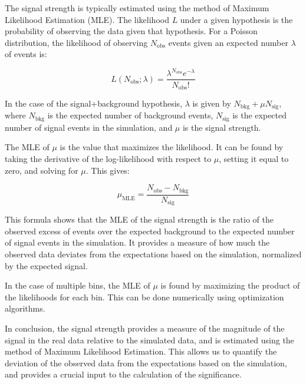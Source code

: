 The signal strength is typically estimated using the method of Maximum Likelihood Estimation (MLE). The likelihood $L$
under a given hypothesis is the probability of observing the data given that hypothesis. For a Poisson distribution, the
likelihood of observing $N_{\text{obs}}$ events given an expected number $\lambda$ of events is:

\begin{equation}
    L(N_{\text{obs}}; \lambda) = \frac{\lambda^{N_{\text{obs}}} e^{-\lambda}}{N_{\text{obs}}!}
\end{equation}

In the case of the signal+background hypothesis, $\lambda$ is given by $N_{\text{bkg}} + \mu N_{\text{sig}}$, where
$N_{\text{bkg}}$ is the expected number of background events, $N_{\text{sig}}$ is the expected number of signal events
in the simulation, and $\mu$ is the signal strength.

The MLE of $\mu$ is the value that maximizes the likelihood. It can be found by taking the derivative of the
log-likelihood with respect to $\mu$, setting it equal to zero, and solving for $\mu$. This gives:

\begin{equation}
    \mu_{\text{MLE}} = \frac{N_{\text{obs}} - N_{\text{bkg}}}{N_{\text{sig}}}
\end{equation}

This formula shows that the MLE of the signal strength is the ratio of the observed excess of events over the expected
background to the expected number of signal events in the simulation. It provides a measure of how much the observed
data deviates from the expectations based on the simulation, normalized by the expected signal.

In the case of multiple bins, the MLE of $\mu$ is found by maximizing the product of the likelihoods for each bin. This
can be done numerically using optimization algorithms.

In conclusion, the signal strength provides a measure of the magnitude of the signal in the real data relative to the
simulated data, and is estimated using the method of Maximum Likelihood Estimation. This allows us to quantify the
deviation of the observed data from the expectations based on the simulation, and provides a crucial input to the
calculation of the significance.

